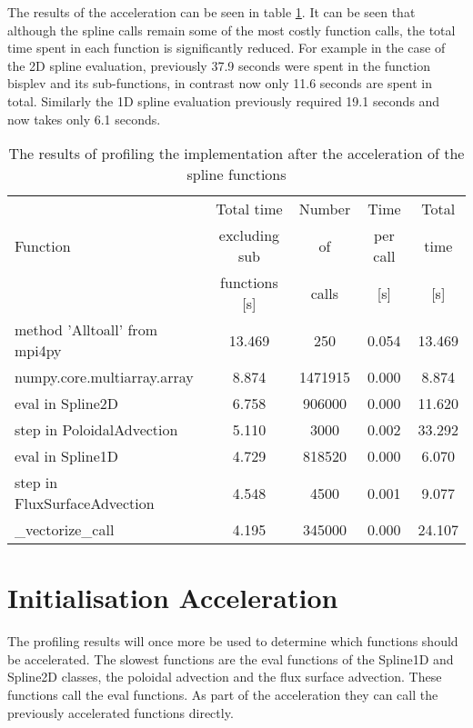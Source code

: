 The results of the acceleration can be seen in table \ref{tab::spline profile}. It can be seen that although the spline calls remain some of the most costly function calls, the total time spent in each function is significantly reduced. For example in the case of the 2D spline evaluation, previously 37.9 seconds were spent in the function bisplev and its sub-functions, in contrast now only 11.6 seconds are spent in total. Similarly the 1D spline evaluation previously required 19.1 seconds and now takes only 6.1 seconds.

\begin{table}[ht]
\centering
 \begin{tabular}{|m{}|c|c|c|c|}
  \hline
          & Total time & Number & Time & Total \\
  Function & excluding sub & of & per call & time \\
          & functions [s] & calls & [s] & [s] \\
  \hline
  \hline
  method 'Alltoall' from mpi4py & 13.469 & 250 & 0.054 & 13.469 \\
  \hline
  numpy.core.multiarray.array & 8.874 & 1471915 & 0.000 & 8.874 \\
  \hline
  eval in Spline2D & 6.758 & 906000 & 0.000 & 11.620\\
  \hline
  step in PoloidalAdvection & 5.110 & 3000 & 0.002 & 33.292\\
  \hline
  eval in Spline1D & 4.729 & 818520 & 0.000 & 6.070\\
  \hline
  step in FluxSurfaceAdvection & 4.548 & 4500 & 0.001 & 9.077\\
  \hline
  \_vectorize\_call & 4.195 & 345000 & 0.000 & 24.107\\
  \hline
 \end{tabular}
 \caption{\label{tab::spline profile} The results of profiling the implementation after the acceleration of the spline functions}
\end{table}

\section{Initialisation Acceleration}

The profiling results will once more be used to determine which functions should be accelerated. The slowest functions are the eval functions of the Spline1D and Spline2D classes, the poloidal advection and the flux surface advection. These functions call the eval functions. As part of the acceleration they can call the previously accelerated functions directly.

